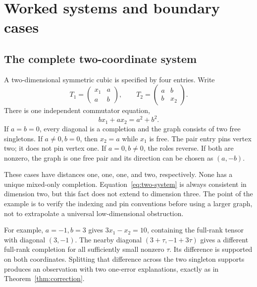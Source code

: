 \section{Worked systems and boundary cases}\label{app:worked}
\subsection{The complete two-coordinate system}
A two-dimensional symmetric cubic is specified by four entries. Write
\[
 T_1=\begin{pmatrix}x_1&a\\a&b\end{pmatrix},\qquad
 T_2=\begin{pmatrix}a&b\\b&x_2\end{pmatrix}.
\]
There is one independent commutator equation,
\begin{equation}\label{eq:two-system}
 bx_1+ax_2=a^2+b^2.
\end{equation}
If $a=b=0$, every diagonal is a completion and the graph consists of two free singletons. If $a\ne0,b=0$, then $x_2=a$ while $x_1$ is free. The pair entry pins vertex two; it does not pin vertex one. If $a=0,b\ne0$, the roles reverse. If both are nonzero, the graph is one free pair and its direction can be chosen as $(a,-b)$.

These cases have distances one, one, one, and two, respectively. None has a unique mixed-only completion. Equation~\eqref{eq:two-system} is always consistent in dimension two, but this fact does not extend to dimension three. The point of the example is to verify the indexing and pin conventions before using a larger graph, not to extrapolate a universal low-dimensional obstruction.

For example, $a=-1,b=3$ gives $3x_1-x_2=10$, containing the full-rank tensor with diagonal $(3,-1)$. The nearby diagonal $(3+\tau,-1+3\tau)$ gives a different full-rank completion for all sufficiently small nonzero $\tau$. Its difference is supported on both coordinates. Splitting that difference across the two singleton supports produces an observation with two one-error explanations, exactly as in Theorem~\ref{thm:correction}.

